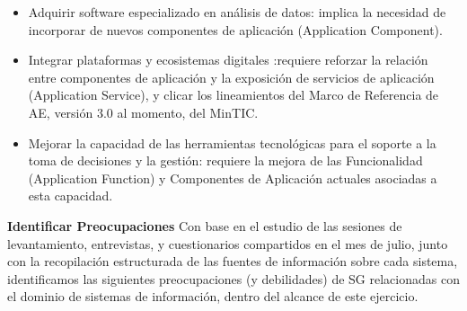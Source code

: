 \documentclass[
	a4paper, %
	12pt, %
]{include/CSSullivanBusinessReport}
\def\tightlist{}
\begin{document}
\begin{itemize}
\tightlist
\item
  Adquirir software especializado en análisis de datos: implica la
  necesidad de incorporar de nuevos componentes de aplicación
  (Application Component).
\item
  Integrar plataformas y ecosistemas digitales :requiere reforzar la
  relación entre componentes de aplicación y la exposición de servicios
  de aplicación (Application Service), y clicar los lineamientos del
  Marco de Referencia de AE, versión 3.0 al momento, del MinTIC.
\item
  Mejorar la capacidad de las herramientas tecnológicas para el soporte
  a la toma de decisiones y la gestión: requiere la mejora de las
  Funcionalidad (Application Function) y Componentes de Aplicación
  actuales asociadas a esta capacidad.
\end{itemize}

\textbf{Identificar Preocupaciones} Con base en el estudio de las
sesiones de levantamiento, entrevistas, y cuestionarios compartidos en
el mes de julio, junto con la recopilación estructurada de las fuentes
de información sobre cada sistema, identificamos las siguientes
preocupaciones (y debilidades) de SG relacionadas con el dominio de
sistemas de información, dentro del alcance de este ejercicio.
\end{document}
